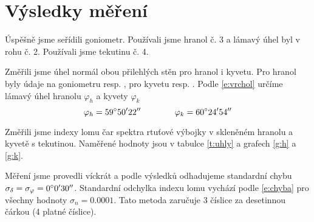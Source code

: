 \section*{Výsledky měření}
Úspěšně jsme seřídili goniometr.
Používali jsme hranol č. 3 a lámavý úhel byl v rohu č. 2.
Používali jsme tekutinu č. 4.

Změřili jsme úhel normál obou přilehlých stěn pro hranol i kyvetu. Pro hranol byly údaje na goniometru  resp. , pro kyvetu  resp. . Podle \eqref{e:vrchol} určíme lámavý úhel hranolu $\varphi_h$ a kyvety $\varphi_k$
\begin{equation*}
\varphi_h = \ang{59 ; 50 ; 22} \qquad \qquad \varphi_k = \ang{60 ; 24 ; 54}
\end{equation*}



Změřili jsme indexy lomu čar spektra rtuťové výbojky v skleněném hranolu a kyvetě s tekutinou. Naměřené hodnoty jsou v tabulce \ref{t:uhly} a grafech \ref{g:h} a \ref{g:k}.


Měření jsme provedli víckrát a podle výsledků odhadujeme standardní chybu $\sigma_\delta = \sigma_\varphi = \ang{0 ; 0 ; 30}$. Standardní odchylka indexu lomu vychází podle \eqref{e:chyba} pro všechny hodnoty $\sigma_n=\num{0.0001}$. Tato metoda zaručuje 3 číslice za desetinnou čárkou (4 platné číslice).


